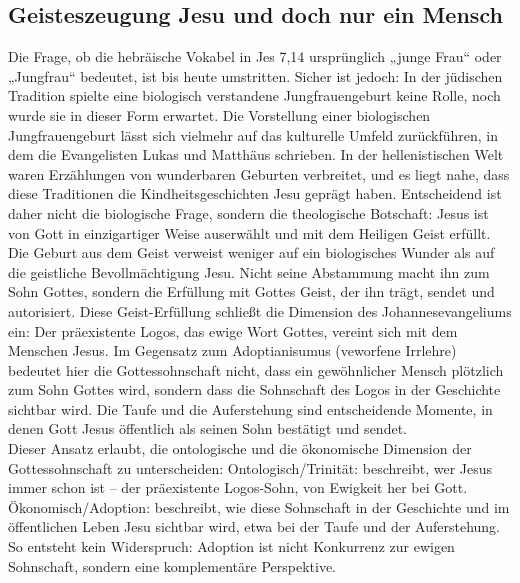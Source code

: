 \subsection{Geisteszeugung Jesu und doch nur ein Mensch}
Die Frage, ob die hebräische Vokabel in Jes 7,14 ursprünglich „junge Frau“ oder „Jungfrau“ bedeutet, ist bis heute umstritten. Sicher ist jedoch: In der jüdischen Tradition spielte eine biologisch verstandene Jungfrauengeburt keine Rolle, noch wurde sie in dieser Form erwartet. Die Vorstellung einer biologischen Jungfrauengeburt lässt sich vielmehr auf das kulturelle Umfeld zurückführen, in dem die Evangelisten Lukas und Matthäus schrieben. In der hellenistischen Welt waren Erzählungen von wunderbaren Geburten verbreitet, und es liegt nahe, dass diese Traditionen die Kindheitsgeschichten Jesu geprägt haben. Entscheidend ist daher nicht die biologische Frage, sondern die theologische Botschaft: Jesus ist von Gott in einzigartiger Weise auserwählt und mit dem Heiligen Geist erfüllt.\\

Die \glqq Geburt aus dem Geist\grqq{} verweist weniger auf ein biologisches Wunder als auf die geistliche Bevollmächtigung Jesu. Nicht seine Abstammung macht ihn zum Sohn Gottes, sondern die Erfüllung mit Gottes Geist, der ihn trägt, sendet und autorisiert. Diese Geist-Erfüllung schließt die Dimension des Johannesevangeliums ein: Der präexistente Logos, das ewige Wort Gottes, vereint sich mit dem Menschen Jesus. Im Gegensatz zum Adoptianisumus (veworfene Irrlehre) bedeutet hier die Gottessohnschaft nicht, dass ein gewöhnlicher Mensch plötzlich zum Sohn Gottes wird, sondern dass die Sohnschaft des Logos in der Geschichte sichtbar wird. Die Taufe und die Auferstehung sind entscheidende Momente, in denen Gott Jesus öffentlich als seinen Sohn bestätigt und sendet. \\

Dieser Ansatz erlaubt, die ontologische und die ökonomische Dimension der Gottessohnschaft zu unterscheiden: Ontologisch/Trinität: beschreibt, wer Jesus immer schon ist – der präexistente Logos-Sohn, von Ewigkeit her bei Gott. Ökonomisch/Adoption: beschreibt, wie diese Sohnschaft in der Geschichte und im öffentlichen Leben Jesu sichtbar wird, etwa bei der Taufe und der Auferstehung. \\
So entsteht kein Widerspruch: Adoption ist nicht Konkurrenz zur ewigen Sohnschaft, sondern eine komplementäre Perspektive.\\

